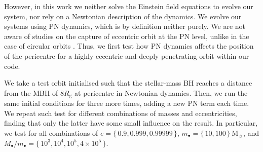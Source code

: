 \documentclass[desactivate]{aa}
\begin{document}
        However, in this work we neither solve the Einstein field equations to evolve our system, nor rely on a Newtonian description of the dynamics. We evolve our systems using PN dynamics, which is by definition neither purely. We are not aware of studies on the capture of eccentric orbit at the PN level, unlike in the case of circular orbits \citep[e.g.][]{2024LRR....27....2S}. Thus, we first test how PN dynamics affects the position of the pericentre for a highly eccentric and deeply penetrating orbit within our code.

        We take a test orbit initialised such that the stellar-mass BH reaches a distance from the MBH of $8 R_\mathrm{g}$ at pericentre in Newtonian dynamics. Then, we run the same initial conditions for three more times, adding a new PN term each time. We repeat such test for different combinations of masses and eccentricities, finding that only the latter have some small influence on the result. In particular, we test for all combinations of $e = \{ \,0.9,0.999,0.99999\, \} $, $m_\bullet=\{\,10,100\,\} \, \mathrm{M_\sun}$, and $M_\bullet/m_\bullet = \{\,10^3,10^4,10^5,4 \times 10^5\,\}$.
\end{document}

